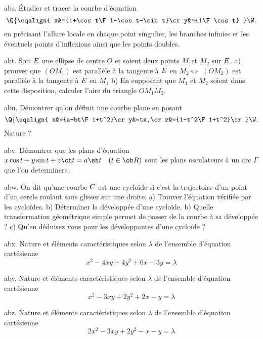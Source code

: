 \exo [Level=1,Fight=0,Learn=1,Field=\CourbesParamétréesCartésiennes,Type=\Exercices,Origin=] abs. 
\'Etudier et tracer la courbe d'équation 
$$
\Q\{\eqalign{
x&={1+\cos t\F 1-\cos t-\sin t}\cr
y&={1\F\cos t}
}\W.
$$ 
en précisant l'allure  locale en chaque point singulier, les branches infinies 
et les éventuels points d'inflexions ainsi que les points doubles. 

\exo [Level=2,Fight=1,Learn=1,Field=\RepèreDeFrenet,Type=\Exercices,Origin=] abt. 
Soit $\sc E$ une ellipse de centre $O$ et soient deux points $M_1 $et $M_2$ sur $\sc E$. 
\pn
a) prouver que $(OM_1)$ est parallèle à la tangente à $\sc E$ en $M_2\Longleftrightarrow$ 
$(OM_2)$ est parallèle à la tangente à $\sc E$ en $M_1$\pn
b) En supposant que $M_1$ et $M_2$ soient dans cette disposition, 
calculer l'aire du triangle $OM_1M_2$. 

\exo [Level=2,Fight=1,Learn=1,Field=\RepèreDeFrenet,Type=\Exercices,Origin=] abu. 
Démontrer qu'on définit une courbe plane en posant 
$$
\Q\{\eqalign{
x&={a+bt\F1+t^2}\cr 
y&=tx,\cr 
z&={1-t^2\F1+t^2}\cr
}\W.
$$
Nature ? 

\exo [Level=2,Fight=3,Learn=2,Field=\RepèreDeFrenet|\Enveloppes,Type=\Exercices,Origin=\MP] abv. 
Démontrer que les plans d'équation $x\cos t+y\sin t+z\ch t=a\sh t\quad(t\in\ob R)$ 
sont les plans osculateurs à un arc $\Gamma$ que l'on determinera. 

\exo [Level=2,Fight=3,Learn=2,Field=\Roulement|\Développées,Type=\Exercices,Origin=\MP] abw. 
On dit qu'une courbe $\sc C$ est une cycloïde si 
c'est la trajectoire d'un point d'un cercle roulant sans glisser sur une droite. 
\pn
a) Trouver l'équation vérifiée par les cycloïdes. 
b) Déterminer la développée d'une cycloïde. \pn
b) Quelle transformation géométrique simple permet de passer de la courbe à sa développée ?\pn
c) Qu'en déduisez vous pour les développantes d'une cycloïde ? 

\exo [Level=2,Fight=1,Learn=1,Field=\FormesQuadratiques,Type=\Exercices,Origin=] abx. 
Nature et éléments caractéristiques selon $\lambda$ 
de l'ensemble d'équation cartésienne 
$$ 
x^2-4xy+4y^2+6x-3y=\lambda
$$

\exo [Level=2,Fight=1,Learn=1,Field=\FormesQuadratiques,Type=\Exercices,Origin=] aby. 
Nature et éléments caractéristiques selon $\lambda$ 
de l'ensemble d'équation cartésienne 
$$ 
x^2-3xy+2y^2+2x-y=\lambda
$$

\exo [Level=2,Fight=1,Learn=1,Field=\FormesQuadratiques,Type=\Exercices,Origin=] abz. 
Nature et éléments caractéristiques selon $\lambda$ 
de l'ensemble d'équation cartésienne 
$$ 
2x^2-3xy+2y^2-x-y=\lambda
$$

